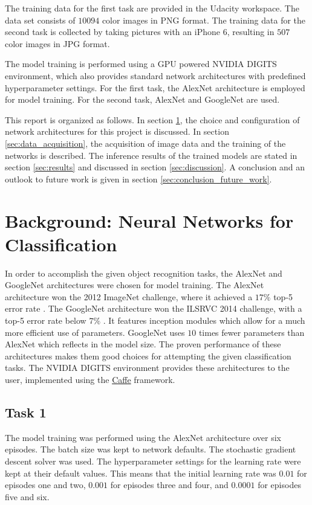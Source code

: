 \documentclass[10pt, journal, compsoc]{IEEEtran}
\newcommand{\an}{AlexNet }
\newcommand{\gn}{GoogleNet }
\begin{document}
The training data for the first task are provided in the Udacity workspace. The data set consists of $10094$ color images in PNG format. The training data for the second task is collected by taking pictures with an iPhone 6, resulting in $507$ color images in JPG format. 

The model training is performed using a GPU powered NVIDIA DIGITS environment, which also provides standard network architectures with  predefined hyperparameter settings. For the first task, the \an architecture \cite{NIPS2012_4824} is employed for model training. For the second task, \an \cite{NIPS2012_4824} and \gn \cite{DBLP:journals/corr/SzegedyLJSRAEVR14} are used.

This report is organized as follows. In section \ref{sec:background}, the choice and configuration of network architectures for this project is discussed. In section \ref{sec:data_acquisition}, the acquisition of image data and the training of the networks is described. The inference results of the trained models are stated in section \ref{sec:results} and discussed in section \ref{sec:discussion}. A conclusion and an outlook to future work is given in section \ref{sec:conclusion_future_work}.

\section{Background: Neural Networks for Classification}
\label{sec:background}
In order to accomplish the given object recognition tasks, the \an and \gn architectures were chosen for model training. The \an architecture  \cite{NIPS2012_4824} won the 2012 ImageNet challenge, where it achieved a $17 \%$ top-5 error rate \cite{geron}. The \gn architecture \cite{DBLP:journals/corr/SzegedyLJSRAEVR14} won the ILSRVC 2014 challenge, with a top-5 error rate below  $7 \%$ \cite{geron}. It features inception modules which allow for a much more efficient use of parameters. \gn uses $10$ times fewer parameters than \an which reflects in the model size. The proven performance of these architectures makes them good choices for attempting the given classification tasks. The NVIDIA DIGITS environment provides these architectures to the user, implemented using the \href{http://caffe.berkeleyvision.org/}{Caffe} framework.

\subsection{Task 1}
The model training was performed using the \an architecture over six episodes. The batch size was kept to network defaults. The stochastic gradient descent solver was used. The hyperparameter settings for the learning rate were kept at their default values. This means that the initial learning rate was $0.01$ for episodes one and two, $0.001$ for episodes three and four, and $0.0001$ for episodes five and six.
\end{document}
